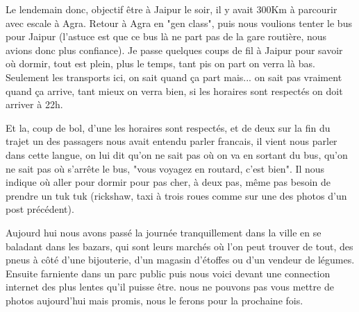 \begin{multicols}{2}
Le lendemain donc, objectif être à Jaipur le soir, il y avait 300Km à parcourir avec escale à Agra. Retour à Agra en "gen class", puis nous voulions tenter le bus pour Jaipur (l'astuce est que ce bus là ne part pas de la gare routière, nous avions donc plus confiance). Je passe quelques coups de fil à Jaipur pour savoir où dormir, tout est plein, plus le temps, tant pis on part on verra là bas. Seulement les transports ici, on sait quand ça part mais... on sait pas vraiment quand ça arrive, tant mieux on verra bien, si les horaires sont respectés on doit arriver à 22h.

Et la, coup de bol, d'une les horaires sont respectés, et de deux sur la fin du trajet un des passagers nous avait entendu parler francais, il vient nous parler dans cette langue, on lui dit qu'on ne sait pas où on va en sortant du bus, qu'on ne sait pas où s'arrête le bus, "vous voyagez en routard, c'est bien". Il nous indique où aller pour dormir pour pas cher, à deux pas, même pas besoin de prendre un tuk tuk (rickshaw, taxi à trois roues comme sur une des photos d'un post précédent).

Aujourd hui nous avons passé la journée tranquillement dans la ville en se baladant dans les bazars, qui sont leurs marchés où l'on peut trouver de tout, des pneus à côté d'une bijouterie, d'un magasin d'étoffes ou d'un vendeur de légumes. Ensuite farniente dans un parc public puis nous voici devant une connection internet des plus lentes qu'il puisse être. nous ne pouvons pas vous mettre de photos aujourd'hui mais promis, nous le ferons pour la prochaine fois.

\end{multicols}


